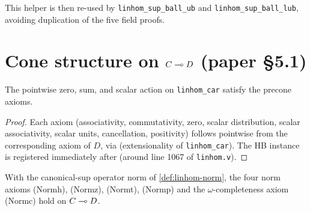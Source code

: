 This helper is then re-used by \texttt{linhom\_sup\_ball\_ub} and
\texttt{linhom\_sup\_ball\_lub}, avoiding duplication of the five
field proofs.

\section{Cone structure on \texorpdfstring{$C \multimap D$}{C -> D} (paper \S5.1)}%
\label{sec:linhom-cone}

\begin{lemma}\label{lem:linhom-precone}
\rocqok
{}
The pointwise zero, sum, and scalar action on \texttt{linhom\_car}
satisfy the precone axioms.
\end{lemma}

\begin{proof}
Each axiom (associativity, commutativity, zero, scalar
distribution, scalar associativity, scalar units, cancellation,
positivity) follows pointwise from the corresponding axiom of $D$,
via  (extensionality of
\texttt{linhom\_car}). The HB instance is registered immediately
after  (around line 1067 of
\texttt{linhom.v}).
\end{proof}

\begin{lemma}\label{lem:linhom-cone}
\rocqok
{}
With the canonical-sup operator norm of \autoref{def:linhom-norm},
the four norm axioms (Normh), (Normz), (Normt), (Normp) and the
$\omega$-completeness axiom (Normc) hold on $C \multimap D$.
\end{lemma}

